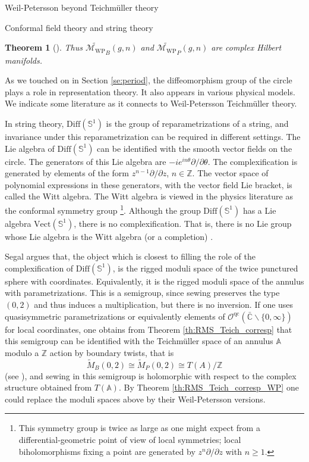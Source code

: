 \documentclass[12pt]{amsart}
\newcommand{\sphere}{\bar{\Bbb{C}}} %
\renewcommand{\Bbb}[1]{\ensuremath{\mathbb{#1}}}
\theoremstyle{plain}
\newtheorem{theorem}{Theorem}[section]
\theoremstyle{definition}
\theoremstyle{remark}
\numberwithin{equation}{section} %
\numberwithin{figure}{section} %
\begin{document}
\begin{section}{Weil-Petersson beyond Teichm\"uller theory}
\begin{subsection}{Conformal field theory and string theory}
\begin{theorem}[\cite{RSS_WP2}]
 Thus $\widetilde{\mathcal{M}_{\mathrm{WP}}}_B(g,n)$ and  $\widetilde{\mathcal{M}_{\mathrm{WP}}}_P(g,n)$ are complex Hilbert manifolds. 
\end{theorem}
  
  
  As we touched on in Section \ref{se:period}, the diffeomorphism group of the circle plays a role in representation theory. It also appears in various physical models. We indicate some literature as it connects to Weil-Petersson Teichm\"uller theory. 
  
  In string theory, $\mathrm{Diff}(\mathbb{S}^1)$ is the group of reparametrizations of a string, and invariance under this reparametrization can be required in different settings.  The Lie algebra of $\mathrm{Diff}(\mathbb{S}^1)$ can be identified with the smooth vector fields on the circle. The generators of this Lie algebra are $-i e^{i n \theta} \partial/\partial \theta$. The complexification is generated by elements of the form $z^{n-1}\partial/\partial z$, $n \in \mathbb{Z}$.   The vector space of polynomial expressions in these generators, with the vector field Lie bracket, is called the Witt algebra.   
  The Witt algebra is viewed in the physics literature as the conformal symmetry group \cite{BPZ,Schottenloher}\footnote{This symmetry group is twice as large as one might expect from a differential-geometric point of view of local symmetries; local biholomorphisms fixing a point are generated by $z^n \partial/\partial z$ with $n\geq 1$.}. Although the group $\mathrm{Diff}(\mathbb{S}^1)$ has a Lie algebra $\mathrm{Vect}(\mathbb{S}^1)$, there is no complexification. That is, there is no Lie group whose Lie algebra is the Witt algebra (or a completion) \cite{Schottenloher}. 
  
  Segal \cite{Segal87,SegalPreprint} argues that, the object which is closest to filling the role of the complexification of $\mathrm{Diff}(\mathbb{S}^1)$, is the rigged moduli space of the twice punctured sphere with coordinates. Equivalently, it is the rigged moduli space of the annulus with parametrizations. This is a semigroup, since sewing preserves the type $(0,2)$ and thus induces a multiplication, but there is no inversion. If one uses quasisymmetric parametrizations or equivalently elements of $\mathcal{O}^{\mathrm{qc}}(\sphere \backslash \{0,\infty \})$ for local coordinates, one obtains from Theorem \ref{th:RMS_Teich_corresp} that this semigroup can be identified with the Teichm\"uller space of an annulus $\mathbb{A}$ modulo a $\mathbb{Z}$ action by boundary twists, that is  
  \[  \widetilde{M}_B(0,2) \cong \widetilde{M}_P(0,2) \cong T(A)/\mathbb{Z}     \] 
  (see \cite{RadnellSchippers_annulus}), and sewing in this semigroup is holomorphic with respect to the complex structure obtained from $T(\mathbb{A})$. By Theorem \ref{th:RMS_Teich_corresp_WP} one could replace the moduli spaces above by their Weil-Petersson versions.
  \\ 


\end{subsection}
\end{section}
\end{document}
